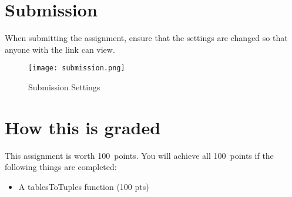 \documentclass{article}
\newcommand{\AValue}{100}
\begin{document}
\section*{Submission}
When submitting the assignment, ensure that the settings are changed so that anyone with the link can view.
\begin{figure}[H]
  \centering
  \texttt{[image: submission.png]}
  \caption{Submission Settings}
\end{figure}

\section*{How this is graded}
This assignment is worth \AValue \ points. You will achieve all \AValue \   points if the following things are completed:
\begin{itemize}
    \item A tablesToTuples function (100 pts)
\end{itemize}
\end{document}

